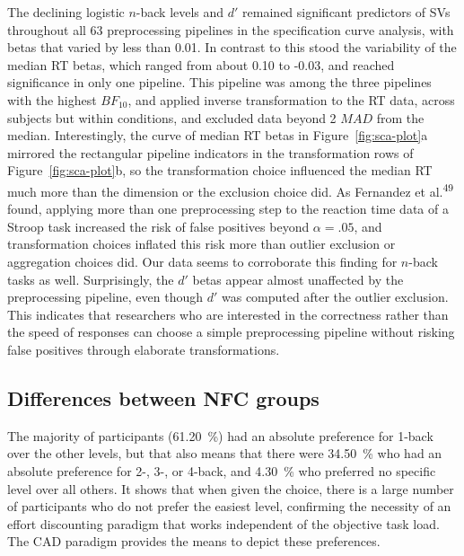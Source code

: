 \documentclass[
  man,floatsintext]{apa6}
\begin{document}
The declining logistic \(n\)-back levels and \(d'\) remained significant predictors of SVs throughout all 63 preprocessing pipelines in the specification curve analysis, with betas that varied by less than 0.01.
In contrast to this stood the variability of the median RT betas, which ranged from about 0.10 to -0.03, and reached significance in only one pipeline.
This pipeline was among the three pipelines with the highest \(BF_{10}\), and applied inverse transformation to the RT data, across subjects but within conditions, and excluded data beyond 2 \(MAD\) from the median.
Interestingly, the curve of median RT betas in Figure~\ref{fig:sca-plot}a mirrored the rectangular pipeline indicators in the transformation rows of Figure~\ref{fig:sca-plot}b, so the transformation choice influenced the median RT much more than the dimension or the exclusion choice did.
As Fernandez et al.\textsuperscript{49} found, applying more than one preprocessing step to the reaction time data of a Stroop task increased the risk of false positives beyond \(\alpha=.05\), and transformation choices inflated this risk more than outlier exclusion or aggregation choices did.
Our data seems to corroborate this finding for \(n\)-back tasks as well.
Surprisingly, the \(d'\) betas appear almost unaffected by the preprocessing pipeline, even though \(d'\) was computed after the outlier exclusion.
This indicates that researchers who are interested in the correctness rather than the speed of responses can choose a simple preprocessing pipeline without risking false positives through elaborate transformations.

\hypertarget{differences-between-nfc-groups-1}{%
\subsection{Differences between NFC groups}\label{differences-between-nfc-groups-1}}

The majority of participants (61.20~\%) had an absolute preference for 1-back over the other levels, but that also means that there were 34.50~\% who had an absolute preference for 2-, 3-, or 4-back, and 4.30~\% who preferred no specific level over all others.
It shows that when given the choice, there is a large number of participants who do not prefer the easiest level, confirming the necessity of an effort discounting paradigm that works independent of the objective task load.
The CAD paradigm provides the means to depict these preferences.
\end{document}
